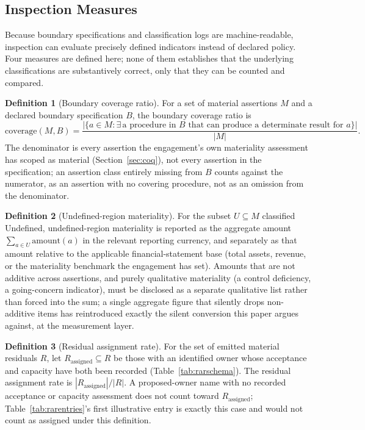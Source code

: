 \documentclass[11pt,a4paper]{article}
\theoremstyle{definition}
\newtheorem{definition}{Definition}[section]
\theoremstyle{remark}
\begin{document}
\subsection{Inspection Measures}
\label{sec:inspection}

Because boundary specifications and classification logs are machine-readable, inspection can evaluate precisely defined indicators instead of declared policy. Four measures are defined here; none of them establishes that the underlying classifications are substantively correct, only that they can be counted and compared.

\begin{definition}[Boundary coverage ratio]
\label{def:coverage}
For a set of material assertions $M$ and a declared boundary specification $B$, the boundary coverage ratio is
\[
\mathrm{coverage}(M, B) = \frac{|\{a \in M : \exists\, \text{a procedure in } B \text{ that can produce a determinate result for } a\}|}{|M|}.
\]
The denominator is every assertion the engagement's own materiality assessment has scoped as material (Section~\ref{sec:coq}), not every assertion in the specification; an assertion class entirely missing from $B$ counts against the numerator, as an assertion with no covering procedure, not as an omission from the denominator.
\end{definition}

\begin{definition}[Undefined-region materiality]
\label{def:undefmat}
For the subset $U \subseteq M$ classified \textsf{Undefined}, undefined-region materiality is reported as the aggregate amount $\sum_{a \in U} \mathrm{amount}(a)$ in the relevant reporting currency, and separately as that amount relative to the applicable financial-statement base (total assets, revenue, or the materiality benchmark the engagement has set). Amounts that are not additive across assertions, and purely qualitative materiality (a control deficiency, a going-concern indicator), must be disclosed as a separate qualitative list rather than forced into the sum; a single aggregate figure that silently drops non-additive items has reintroduced exactly the silent conversion this paper argues against, at the measurement layer.
\end{definition}

\begin{definition}[Residual assignment rate]
\label{def:assignrate}
For the set of emitted material residuals $R$, let $R_{\mathrm{assigned}} \subseteq R$ be those with an identified owner whose acceptance and capacity have both been recorded (Table~\ref{tab:rarschema}). The residual assignment rate is $|R_{\mathrm{assigned}}| / |R|$. A proposed-owner name with no recorded acceptance or capacity assessment does not count toward $R_{\mathrm{assigned}}$; Table~\ref{tab:rarentries}'s first illustrative entry is exactly this case and would not count as assigned under this definition.
\end{definition}
\end{document}
